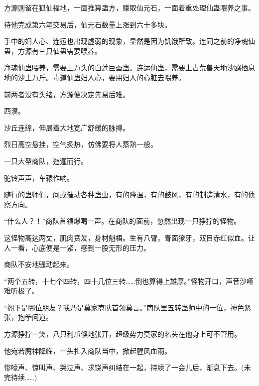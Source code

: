 \begin{this_body}
方源则留在狐仙福地，一面推算蛊方，赚取仙元石，一面着重处理仙蛊喂养之事。

待他完成第六笔交易后，仙元石数量上涨到六十多块。

手中的妇人心、连运也出现虚弱的现象，显然是因为饥饿所致。连同之前的净魂仙蛊，方源有三只仙蛊需要喂养。

净魂仙蛊喂养，需要上万头的白莲巨蚕蛊。连运仙蛊，需要上古荒兽天地沙鸥栖息地的沙土万斤。毒道仙蛊妇人心，要用妇人的心脏去喂养。

前两者没有头绪，方源便决定先易后难。

西漠。

沙丘连绵，伸展着大地宽广舒缓的脉搏。

烈日高空悬挂，空气炙热，仿佛要将人蒸熟一般。

一只大型商队，迤逦而行。

驼铃声声，车辕作响。

随行的蛊师们，间或催动各种蛊虫，有的降温，有的鼓风，有的制造清水，有的侦察方向。

“什么人？！”商队首领爆喝一声。在商队的面前，忽然出现一只狰狞的怪物。

这怪物高达两丈，肌肉贲发，身材魁梧。生有八臂，青面獠牙，双目赤红似血。让人一看，心底便是一紧，感到一股无形的压力。

商队不安地骚动起来。

“两个五转，十七个四转，四十几位三转……倒也算得上雄厚。”怪物开口，声音沙哑难听极了。

“阁下是哪位朋友？我乃是莫家商队首领莫言。”商队里五转蛊师中的一位，神色紧张，抱拳问道。

方源狰狞一笑，八只利爪倏地张开，超级势力莫家的名头在他身上可不管用。

他宛若魔神降临，一头扎入商队当中，掀起腥风血雨。

惨嚎声、惊叫声、哭泣声、求饶声纠结在一起，持续了一会儿后，渐息下去。(未完待续……)

\end{this_body}

